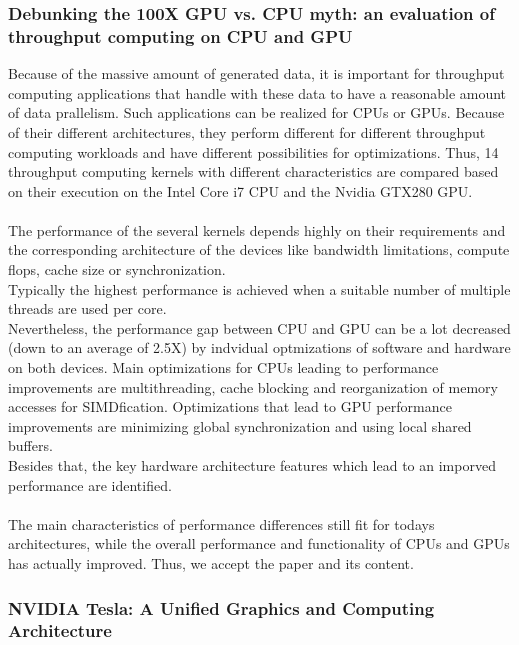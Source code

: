 \documentclass[12pt]{article}
\begin{document}
\subsubsection*{Debunking the 100X GPU vs. CPU myth: an evaluation of throughput computing on CPU and GPU}
Because of the massive amount of generated data, it is important for throughput computing applications that handle with these data to have a reasonable amount of data prallelism. Such applications can be realized for CPUs or GPUs. Because of their different architectures, they perform different for different throughput computing workloads and have different possibilities for optimizations. Thus, 14 throughput computing kernels with different characteristics are compared based on their execution on the Intel Core i7 CPU and the Nvidia GTX280 GPU.\\\\
The performance of the several kernels depends highly on their requirements and the corresponding architecture of the devices like bandwidth limitations, compute flops, cache size or synchronization.\\
Typically the highest performance is achieved when a suitable number of multiple threads are used per core.\\
Nevertheless, the performance gap between CPU and GPU can be a lot decreased (down to an average of 2.5X) by indvidual optmizations of software and hardware on both devices. Main optimizations for CPUs leading to performance improvements are multithreading, cache blocking and reorganization of memory accesses for SIMDfication. Optimizations that lead to GPU performance improvements are minimizing global synchronization and using local shared buffers.\\
Besides that, the key hardware architecture features which lead to an imporved performance are identified.\\\\
The main characteristics of performance differences still fit for todays architectures, while the overall performance and functionality of CPUs and GPUs has actually improved. Thus, we accept the paper and its content.

\vspace{10pt}


\subsubsection*{NVIDIA Tesla: A Unified Graphics and Computing Architecture}
\end{document}
